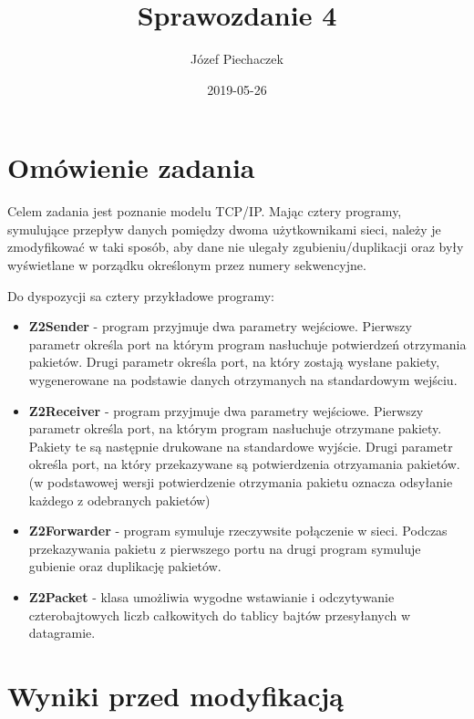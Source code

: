 \documentclass[12pt]{article}
\title{Sprawozdanie 4}
\date{2019-05-26}
\author{Józef Piechaczek}
\begin{document}
\maketitle
\newpage
{}

\section{Omówienie zadania}
Celem zadania jest poznanie modelu TCP/IP. Mając cztery programy, symulujące przepływ danych pomiędzy dwoma użytkownikami sieci, należy je zmodyfikować w taki sposób, aby dane nie ulegały zgubieniu/duplikacji oraz były wyświetlane w porządku określonym przez numery sekwencyjne.

Do dyspozycji sa cztery przykładowe programy:
\begin{itemize}
\itemsep0em
\item \textbf{Z2Sender} - program przyjmuje dwa parametry wejściowe. Pierwszy parametr określa port na którym program nasłuchuje potwierdzeń otrzymania pakietów. Drugi parametr określa port, na który zostają wysłane pakiety, wygenerowane na podstawie danych otrzymanych na standardowym wejściu.
\item \textbf{Z2Receiver} - program przyjmuje dwa parametry wejściowe. Pierwszy parametr określa port, na którym program nasłuchuje otrzymane pakiety. Pakiety te są następnie drukowane na standardowe wyjście. Drugi parametr określa port, na który przekazywane są potwierdzenia otrzyamania pakietów. (w podstawowej wersji potwierdzenie otrzymania pakietu oznacza odsyłanie każdego z odebranych pakietów)
\item \textbf{Z2Forwarder} - program symuluje rzeczywsite połączenie w sieci. Podczas przekazywania pakietu z pierwszego portu na drugi program symuluje gubienie oraz duplikację pakietów.
\item \textbf{Z2Packet} - klasa umożliwia wygodne wstawianie i odczytywanie czterobajtowych liczb całkowitych do tablicy bajtów przesyłanych w datagramie.
\end{itemize}

\newpage
\section{Wyniki przed modyfikacją}
\end{document}
